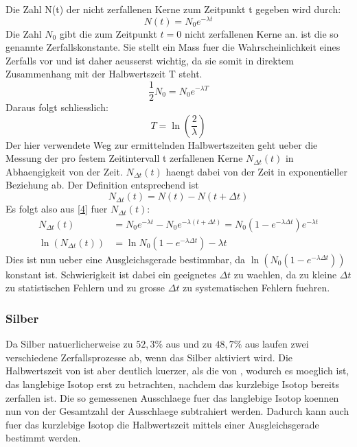 \documentclass[titlepage=firstcover, captions=tableheading]{scrartcl}
\let\ce\ch
\begin{document}
Die Zahl N(t) der nicht zerfallenen Kerne zum Zeitpunkt t gegeben wird durch:
\begin{equation}
    N(t)=N_0e^{-\lambda t} \label{4}
\end{equation}
Die Zahl $N_0$ gibt die zum Zeitpunkt $t=0$ nicht zerfallenen Kerne an. \lambda ist die so genannte Zerfallskonstante. Sie stellt ein Mass fuer die Wahrscheinlichkeit eines Zerfalls vor und ist daher aeusserst wichtig, da sie somit in direktem Zusammenhang mit der Halbwertszeit T steht. 
\begin{equation}
    \frac{1}{2}N_0=N_0e^{-\lambda T}\nonumber
\end{equation}
Daraus folgt schliesslich:
\begin{equation}
    T=\ln(\frac{2}{\lambda}) \nonumber
\end{equation}
Der hier verwendete Weg zur ermittelnden Halbwertszeiten geht ueber die Messung der pro festem Zeitintervall \Delta t  zerfallenen Kerne $N_{\Delta t}(t)$ in Abhaengigkeit von der Zeit. $N_{\Delta t}(t)$ haengt dabei von der Zeit in exponentieller Beziehung ab. Der Definition entsprechend ist 
\begin{equation}
    N_{\Delta t}(t) = N(t) - N(t+\Delta t)
\end{equation}
Es folgt also aus \ref{4} fuer $N_{\Delta t}(t)$:
\begin{align}
    N_{\Delta t}(t)&=N_0e^{-\lambda t}-N_0e^{-\lambda(t+\Delta t)}=N_0(1-e^{-\lambda\Delta t})e^{-\lambda t} \nonumber \\
    \ln(N_{\Delta t}(t))&=\ln N_0(1-e^{-\lambda\Delta t})-\lambda t \nonumber
\end{align}
Dies ist nun ueber eine Ausgleichsgerade bestimmbar, da $\ln(N_0(1-e^{-\lambda\Delta t}))$ konstant ist. Schwierigkeit ist dabei ein geeignetes $\Delta t$ zu waehlen, da zu kleine $\Delta t$ zu statistischen Fehlern und zu grosse $\Delta t$ zu systematischen Fehlern fuehren.
\subsubsection{Silber}
Da Silber natuerlicherweise zu $52,3\%$ aus \ce{^{107}Ag} und zu $48,7\%$ aus \ce{^{109}Ag} laufen zwei verschiedene Zerfallsprozesse ab, wenn das Silber aktiviert wird. Die Halbwertszeit von \ce{^{110}Ag} ist aber deutlich kuerzer, als die von \ce{^{108}Ag}, wodurch es moeglich ist, das langlebige Isotop erst zu betrachten, nachdem das kurzlebige Isotop bereits zerfallen ist. Die so gemessenen Ausschlaege fuer das langlebige Isotop koennen nun von der Gesamtzahl der Ausschlaege subtrahiert werden. Dadurch kann auch fuer das kurzlebige Isotop die Halbwertszeit mittels einer Ausgleichsgerade bestimmt werden.
\end{document}
